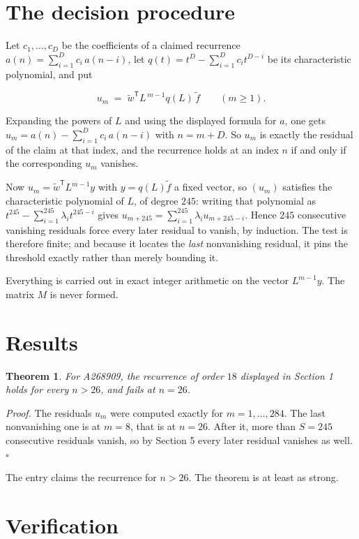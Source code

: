 \documentclass[11pt]{article}
\newtheorem{theorem}{Theorem}
\theoremstyle{definition}
\begin{document}
\section{The decision procedure}

Let $c_1,\dots,c_D$ be the coefficients of a claimed recurrence $a(n) = \sum_{i=1}^{D} c_i\,a(n-i)$, let $q(t) = t^{D} - \sum_{i=1}^{D} c_i t^{D-i}$ be its characteristic polynomial, and put

\[u_m \;=\; \tilde w^{\mathsf T} L^{\,m-1} q(L)\,\tilde f \qquad (m \ge 1).\]

Expanding the powers of $L$ and using the displayed formula for $a$, one gets $u_m = a(n) - \sum_{i=1}^{D} c_i\,a(n-i)$ with $n = m + D$. So $u_m$ is exactly the residual of the claim at that index, and the recurrence holds at an index $n$ if and only if the corresponding $u_m$ vanishes.

Now $u_m = \tilde w^{\mathsf T} L^{m-1} y$ with $y = q(L)\tilde f$ a fixed vector, so $(u_m)$ satisfies the characteristic polynomial of $L$, of degree $245$: writing that polynomial as $t^{245} - \sum_{i=1}^{245} \lambda_i t^{245-i}$ gives $u_{m+245} = \sum_{i=1}^{245} \lambda_i u_{m+245-i}$. Hence $245$ consecutive vanishing residuals force every later residual to vanish, by induction. The test is therefore finite; and because it locates the {\itshape last} nonvanishing residual, it pins the threshold exactly rather than merely bounding it.

Everything is carried out in exact integer arithmetic on the vector $L^{m-1}y$. The matrix $M$ is never formed.

\section{Results}

\begin{theorem} For A268909, the recurrence of order $18$ displayed in Section 1 holds for every $n > 26$, and fails at $n = 26$.\end{theorem}

{\itshape Proof.} The residuals $u_m$ were computed exactly for $m = 1,\dots,284$. The last nonvanishing one is at $m = 8$, that is at $n = 26$. After it, more than $S = 245$ consecutive residuals vanish, so by Section 5 every later residual vanishes as well. $\square$

The entry claims the recurrence for $n > 26$. The theorem is at least as strong.

\section{Verification}
\end{document}
